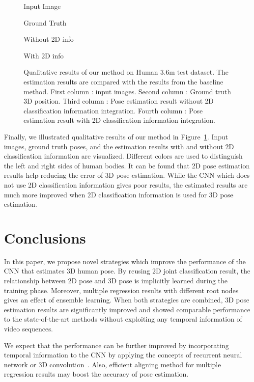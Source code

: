 \documentclass[runningheads]{llncs}
\begin{document}
\begin{figure}[p]
    \begin{minipage}{.22\textwidth}
        \centering
        Input Image
    \end{minipage}\begin{minipage}{0.25\textwidth}
        \centering
        Ground Truth
    \end{minipage}
    \begin{minipage}{0.25\textwidth}
        \centering
        Without 2D info
    \end{minipage}
    \begin{minipage}{0.25\textwidth}
        \centering
        With 2D info
    \end{minipage}
  \label{fig5}
  \caption{Qualitative results of our method on Human 3.6m test dataset. The estimation results are compared with the results from the baseline method. First column : input images. Second column : Ground truth 3D position. Third column : Pose estimation result without 2D classification information integration. Fourth column : Pose estimation result with 2D classification information integration.}
\end{figure}

Finally, we illustrated qualitative results of our method in Figure~\ref{fig5}. Input images, ground truth poses, and the estimation results with and without 2D classification information are visualized. Different colors are used to distinguish the left and right sides of human bodies. It can be found that 2D pose estimation results help reducing the error of 3D pose estimation. While the CNN which does not use 2D classification information gives poor results, the estimated results are much more improved when 2D classification information is used for 3D pose estimation.

\section{Conclusions}
\label{sec:con}

In this paper, we propose novel strategies which improve the performance of the CNN that estimates 3D human pose. By reusing 2D joint classification result, the relationship between 2D pose and 3D pose is implicitly learned during the training phase. Moreover, multiple regression results with different root nodes gives an effect of ensemble learning. When both strategies are combined, 3D pose estimation results are significantly improved and showed comparable performance to the state-of-the-art methods without exploiting any temporal information of video sequences.

We expect that the performance can be further improved by incorporating temporal information to the CNN by applying the concepts of recurrent neural network or 3D convolution~\cite{tran2015learning}. Also, efficient aligning method for multiple regression results may boost the accuracy of pose estimation.



\end{document}
